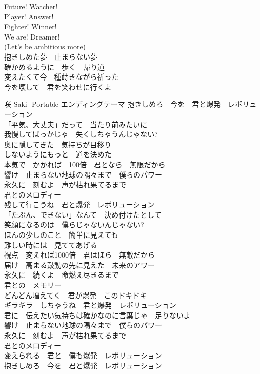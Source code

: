 {Future! Watcher!\\
Player! Answer!\\
Fighter! Winner!\\
We are! Dreamer!\\

(Let's be ambitious more)\\
抱きしめた夢　止まらない夢\\
確かめるように　歩く　帰り道\\
変えたくて今　種蒔きながら祈った\\

今を壊して　君を笑わせに行くよ\\
}

{咲-Saki- Portable エンディングテーマ}
{\kasho
抱きしめろ　今を　君と爆発　レボリューション\\[-.3em]

「平気、大丈夫」だって　当たり前みたいに\\
我慢してばっかじゃ　失くしちゃうんじゃない?\\
奥に隠してきた　気持ちが目移り\\
しないようにもっと　道を決めた\\[-.3em]

本気で　かかれば　100倍　君となら　無限だから\\[-.3em]

響け　止まらない地球の隅々まで　僕らのパワー\\
永久に　刻むよ　声が枯れ果てるまで\\
君とのメロディー\\[-.3em]

残して行こうね　君と爆発　レボリューション\\[-.3em]

「たぶん、できない」なんて　決め付けたとして\\
笑顔になるのは　僕らじゃないんじゃない?\\
ほんの少しのこと　簡単に見えても\\
難しい時には　見ててあげる\\[-.3em]

視点　変えれば1000倍　君はほら　無敵だから\\[-.3em]

届け　高まる鼓動の先に見えた　未来のアワー\\
永久に　続くよ　命燃え尽きるまで\\
君との　メモリー\\[-.3em]

どんどん増えてく　君が爆発　このドキドキ\\
ギラギラ　しちゃうね　君と爆発　レボリューション\\[-.3em]

君に　伝えたい気持ちは確かなのに言葉じゃ　足りないよ\\[-.3em]

響け　止まらない地球の隅々まで　僕らのパワー\\
永久に　刻むよ　声が枯れ果てるまで\\
君とのメロディー\\[-.3em]

変えられる　君と　僕も爆発　レボリューション\\
抱きしめろ　今を　君と爆発　レボリューション
}
